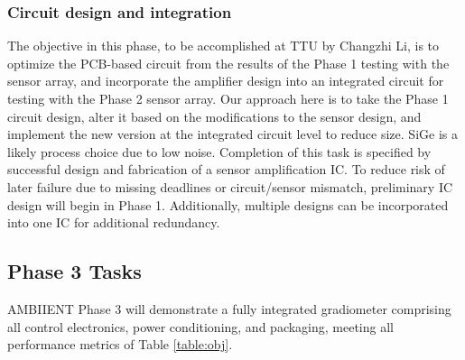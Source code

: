 \subsubsection{Circuit design and integration}\label{sec:p2:cir}

The objective in this phase, to be accomplished at TTU by Changzhi Li, is to optimize the PCB-based circuit from the results of the Phase 1 testing with the sensor array, and incorporate the amplifier design into an integrated circuit for testing with the Phase 2 sensor array. Our approach here is to take the Phase 1 circuit design, alter it based on the modifications to the sensor design, and implement the new version at the integrated circuit level to reduce size. SiGe is a likely process choice due to low noise. Completion of this task is specified by successful design and fabrication of a sensor amplification IC. To reduce risk of later failure due to missing deadlines or circuit/sensor mismatch, preliminary IC design will begin in Phase 1. Additionally, multiple designs can be incorporated into one IC for additional redundancy.

\subsection{Phase 3 Tasks}
AMBIIENT Phase 3 will demonstrate a fully integrated gradiometer comprising all control
electronics, power conditioning, and packaging, meeting all performance metrics of Table  \ref{table:obj}.

